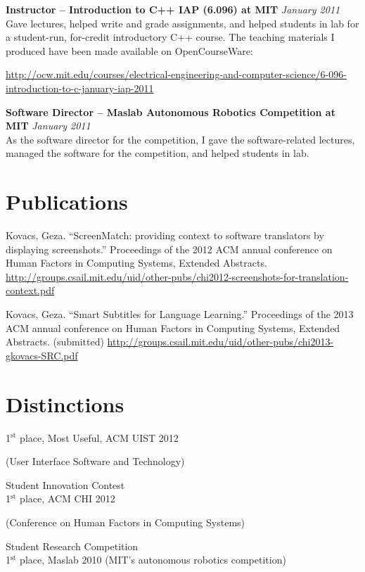 \documentclass[margin,line]{resume}
\begin{document}
\begin{resume}
\textbf{Instructor -- Introduction to C++ IAP (6.096) at MIT} \hfill \textsl{January 2011}\\
Gave lectures, helped write and grade assignments, and helped students in lab for a student-run, for-credit introductory C++ course. The teaching materials I produced have been made available on OpenCourseWare:

\vspace{-4mm}

\url{http://ocw.mit.edu/courses/electrical-engineering-and-computer-science/6-096-introduction-to-c-january-iap-2011} \\

\vspace{-5mm}

\textbf{Software Director -- Maslab Autonomous Robotics Competition at MIT} \hfill \textsl{January 2011}\\
As the software director for the competition, I gave the software-related lectures,
managed the software for the competition, and helped students in lab.



\section{\mysidestyle Publications}

Kovacs, Geza. ``ScreenMatch: providing context to software translators by displaying screenshots.'' Proceedings of the 2012 ACM annual conference on Human Factors in Computing Systems, Extended Abstracts.
\url{http://groups.csail.mit.edu/uid/other-pubs/chi2012-screenshots-for-translation-context.pdf}

Kovacs, Geza. ``Smart Subtitles for Language Learning.'' Proceedings of the 2013 ACM annual conference on Human Factors in Computing Systems, Extended Abstracts. (submitted)
\url{http://groups.csail.mit.edu/uid/other-pubs/chi2013-gkovacs-SRC.pdf}

\section{\mysidestyle Distinctions}

1$^{\textrm{st}}$ place, Most Useful, ACM UIST 2012 \begin{small}(User Interface Software and Technology)\end{small} Student Innovation Contest\\
1$^{\textrm{st}}$ place, ACM CHI 2012 \begin{small}(Conference on Human Factors in Computing Systems)\end{small} Student Research Competition\\
1$^{\textrm{st}}$ place, Maslab 2010 (MIT's autonomous robotics competition)


\end{resume}
\end{document}
